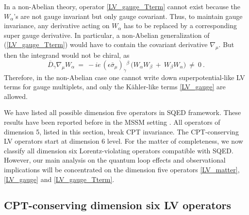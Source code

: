 \documentclass[12pt]{revtex4}
\begin{document}
In a non-Abelian theory, operator \eqref{LV_gauge_Tterm} cannot exist
because the $W_\alpha$'s are not gauge invariant but only gauge covariant.
Thus, to maintain gauge invariance, any derivative acting on 
$ W_\alpha $ has to
be replaced by a corresponding super gauge derivative. 
In particular, a non-Abelian generalization of 
 (\ref{LV_gauge_Tterm}) would have to contain the covariant
derivative $\nabla_\mu$.  
But then the integrand would not be chiral, as 
%
\begin{equation}
\overline{D}_{\dot\gamma} \nabla_\mu W_\alpha ~=~ 
-i e\, (\epsilon \bar\sigma_\mu)_{\dot\gamma}{}^\beta\, 
\Big( W_\alpha W_\beta ~+~ W_\beta W_\alpha \Big) ~\neq~ 0~. 
\end{equation} 
%
Therefore, in the non-Abelian case one cannot write down
superpotential-like LV terms for gauge multiplets, and only 
the K\"ahler-like terms \eqref{LV_gauge} are allowed. 

We have listed all possible dimension five operators in SQED
framework. These results have been reported before in the MSSM setting
\cite{GrootNibbelink:2004za}. 
All operators of dimension 5, listed in this section, break CPT invariance. 
The CPT-conserving LV operators start at dimension 6 level. 
For the matter of completeness, we now classify all dimension 
six Lorentz-violating operators compatible with SQED. 
However, our main analysis on the quantum loop effects and observational 
implications will be concentrated on the dimension five
operators \eqref{LV_matter}, \eqref{LV_gauge} and \eqref{LV_gauge_Tterm}.


\subsection{CPT-conserving dimension six LV operators}
\label{Dim6}
\end{document}
